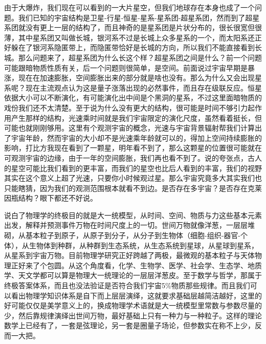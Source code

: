 \documentclass[]{book}
\begin{document}
由于大爆炸，我们现在可以看到的一大片星空，但我们地球存在本身也成了一个问题。我们已知的宇宙结构是卫星-行星-恒星-星系-星系团-超星系团，然而到了超星系团就没有更上一层的结构了，而且神奇的是星系团是片状分布的，很长很宽但很薄，其中星系团又叫做长城，银河系不过是长城上众多星系的一个，而太阳系还正好躲在了银河系隐匿带上，而隐匿带恰好是长城的方向，所以我们不能直接看到长城。那么问题来了，超星系团为什么长这个样？超星系团之间是什么？前一个问题可能跟暗物质性质有关，后一个问题则很简单，是空间。前面说过宇宙早期是暴涨，现在在加速膨胀，空间膨胀出来的部分就是啥也没有。那么为什么又会出现星系呢？现在主流观点认为这是量子涨落出现的必然事件，而且存在级联反应。恒星依据大小可以不断演化，有可能演化出中间是个黑洞的星系，不过这里面暗物质的戏份我们还不太清楚。至于说为什么没有更大的结构，很可能是时间不够引力起作用产生那样的结构，光速乘时间就是我们宇宙限定的演化尺度，虽然看着挺长，但可能也就刚刚够用。这里有个观测宇宙的概念，光速与宇宙背景辐射帮我们计算出了宇宙年龄，然而宇宙的大小却不是光速乘年龄就可以的，得加上空间持续膨胀的影响，打比方我现在看到了一颗星，明年看不到了，那么这颗星的位置很可能就在可观测宇宙的边缘，由于一年的空间膨胀，我们再也看不到了。说的夸张点，古人的星空可能比我们看到的更丰富，而我们的星空也比后人看到的丰富，我们的视野其实在这个意义上超了光速，只要你小时候观过星。那么宇宙究竟多大其实我们也只能瞎猜，因为我们的观测范围根本就看不到边。是否存在多宇宙？是否存在克莱因瓶结构？眼下都还不好说。

说白了物理学的终极目的就是大一统模型，从时间、空间、物质与力这些基本元素出发，解释并预测事件万物在时间尺度上的一切。世间万物就像洋葱，一层层堆砌，从基本粒子到原子，从原子到分子，从分子到生物体（细胞-组织-器官-个体），从生物体到种群，从种群到生态系统，从生态系统到星球，从星球到星系，从星系到宇宙万物。目前物理学研究正好跨越了两极，最微观的基本粒子与天体物理正好来了个包圆。从这个角度看，化学、生物学、医学、社会学、生态学、地质学、天文学都可以算是物理大一统理论的一层层洋葱皮。至于数学与哲学，那属于终极答案体系，而且也没法验证是否符合我们宇宙5\%物质那些规律。而且我们可以看出物理学知识体系是自下而上层层演绎，这就要求基础层越简洁越好，这里的好可能仅仅是美学意义上的，换成物理学术语就是大一统模型里常数与参数尽量的少，然后靠规律演绎出世间万物，最好基础上只有一种力与一种粒子。这样的理论数学上已经有了，一套是弦理论，另一套是圈量子场论，但参数实在称不上少，反而一大把。
\end{document}
